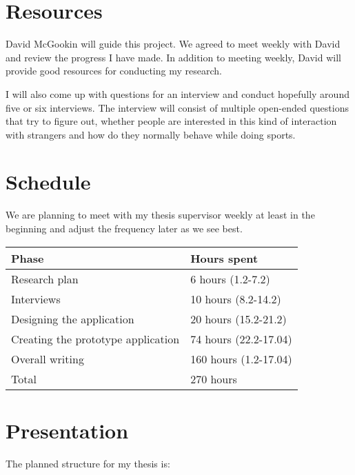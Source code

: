 \documentclass[12pt,a4paper,finnish,oneside]{article}
\begin{document}
\section{Resources}

David McGookin will guide this project. We agreed to meet weekly
with David and review the progress I have made.
In addition to meeting weekly, David will provide good resources
for conducting my research.

I will also come up with questions for an interview and conduct
hopefully around five or six interviews. The interview will consist
of multiple open-ended questions that try to figure out, whether people
are interested in this kind of interaction with strangers and how do they
normally behave while doing sports.

\section{Schedule}

We are planning to meet with my thesis supervisor weekly at least
in the beginning and adjust the frequency later as we see best.

\begin{tabular}{|p{30mm}|p{120mm}|}
\hline
Phase & Hours spent \\ \hline
Research plan   &  6 hours (1.2-7.2) \\ \hline
Interviews   & 10 hours (8.2-14.2) \\ \hline
Designing the application   & 20 hours (15.2-21.2) \\ \hline
Creating the prototype application & 74 hours (22.2-17.04) \\ \hline
Overall writing & 160 hours (1.2-17.04) \\ \hline
Total & 270 hours \\ \hline
\end{tabular}


\section{Presentation}

The planned structure for my thesis is:
\renewcommand{\labelenumii}{\theenumii}
\renewcommand{\theenumii}{\theenumi.\arabic{enumii}.}
\end{document}
